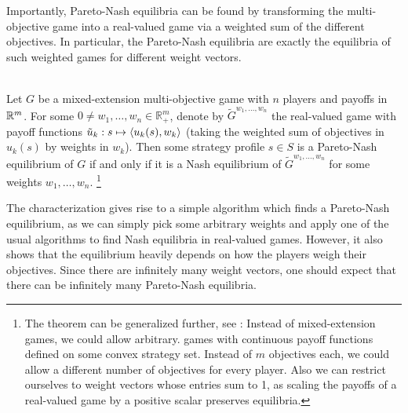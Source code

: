 \documentclass[a4paper]{scrreprt}
\newcommand{\Rp}{\mathbb{R}_+}
\begin{document}
    Importantly, Pareto-Nash equilibria can be found by transforming the multi-objective game into a real-valued game via a weighted sum of the different objectives. In particular, the Pareto-Nash equilibria are exactly the equilibria of such weighted games for different weight vectors.
    
    \begin{thm}~\\
        Let $G$ be a mixed-extension multi-objective game with $n$ players and payoffs in $\mathbb{R}^m$. 
        For some $0 \neq w_1, \dots, w_n \in \Rp^m$, denote by $\tilde{G}^{w_1, \dots, w_n}$ the real-valued game with payoff functions
        $\tilde{u}_k: s \mapsto \left\langle u_k(s), w_k \right\rangle$ (taking the weighted sum of objectives in $u_k(s)$ by weights in $w_k$).
        Then some strategy profile $s \in S$ is a Pareto-Nash equilibrium of $G$ if and only if it is a Nash equilibrium of $\tilde{G}^{w_1, \dots, w_n}$ for some weights $w_1, \dots, w_n$.
        \footnote{The theorem can be generalized further, see \cite{bib:shapleyMultiobjectiveEquilibriumPoints,bib:paretoNashEquilibria}: Instead of mixed-extension games, we could allow arbitrary. games with continuous payoff functions defined on some convex strategy set.  Instead of $m$ objectives each, we could allow a different number of objectives for every player.
        Also we can restrict ourselves to weight vectors whose entries sum to 1, as scaling the payoffs of a real-valued game by a positive scalar preserves equilibria.
        }
        \label{thm:paretoNashEquilibriaWeightingCharacterization}
    \end{thm}

    The characterization gives rise to a simple algorithm which finds a Pareto-Nash equilibrium, as we can simply pick some arbitrary weights and apply one of the usual algorithms to find Nash equilibria in real-valued games.
    However, it also shows that the equilibrium heavily depends on how the players weigh their objectives. Since there are infinitely many weight vectors, one should expect that there can be infinitely many Pareto-Nash equilibria. 
    
\end{document}
